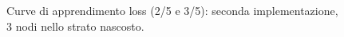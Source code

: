 \documentclass[a4paper,12pt]{article}
\begin{document}
\begin{figure}[htp]
    \centering

    \medskip


    \caption{Curve di apprendimento loss (2/5 e 3/5): seconda implementazione, 3 nodi nello strato nascosto.}
    \label{fig6-2}
\end{figure}
\end{document}
